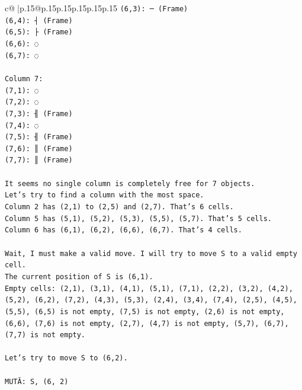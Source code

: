 \documentclass{article}
\begin{document}
{\begin{supertabular}{c@{$\;$}|p{.15\linewidth}@{}p{.15\linewidth}p{.15\linewidth}p{.15\linewidth}p{.15\linewidth}p{.15\linewidth}}
{{{\texttt{(6,3): ─ (Frame)} \\
\texttt{(6,4): ┤ (Frame)} \\
\texttt{(6,5): ├ (Frame)} \\
\texttt{(6,6): ◌} \\
\texttt{(6,7): ◌} \\
\\ 
\texttt{Column 7:} \\
\texttt{(7,1): ◌} \\
\texttt{(7,2): ◌} \\
\texttt{(7,3): ╢ (Frame)} \\
\texttt{(7,4): ◌} \\
\texttt{(7,5): ╢ (Frame)} \\
\texttt{(7,6): ║ (Frame)} \\
\texttt{(7,7): ║ (Frame)} \\
\\ 
\texttt{It seems no single column is completely free for 7 objects.} \\
\texttt{Let's try to find a column with the most space.} \\
\texttt{Column 2 has (2,1) to (2,5) and (2,7). That's 6 cells.} \\
\texttt{Column 5 has (5,1), (5,2), (5,3), (5,5), (5,7). That's 5 cells.} \\
\texttt{Column 6 has (6,1), (6,2), (6,6), (6,7). That's 4 cells.} \\
\\ 
\texttt{Wait, I must make a valid move. I will try to move S to a valid empty cell.} \\
\texttt{The current position of S is (6,1).} \\
\texttt{Empty cells: (2,1), (3,1), (4,1), (5,1), (7,1), (2,2), (3,2), (4,2), (5,2), (6,2), (7,2), (4,3), (5,3), (2,4), (3,4), (7,4), (2,5), (4,5), (5,5), (6,5) is not empty, (7,5) is not empty, (2,6) is not empty, (6,6), (7,6) is not empty, (2,7), (4,7) is not empty, (5,7), (6,7), (7,7) is not empty.} \\
\\ 
\texttt{Let's try to move S to (6,2).} \\
\\ 
\texttt{MUTĂ: S, (6, 2)} \\
            }
        }
    }
     \\ \\


\end{supertabular}}
\end{document}
